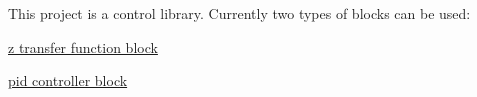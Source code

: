 This project is a control library. Currently two types of blocks can be used\+:
\begin{DoxyItemize}
\item \hyperlink{SystemBlock}{z transfer function block}
\item \hyperlink{PIDBlock}{pid controller block} 
\end{DoxyItemize}